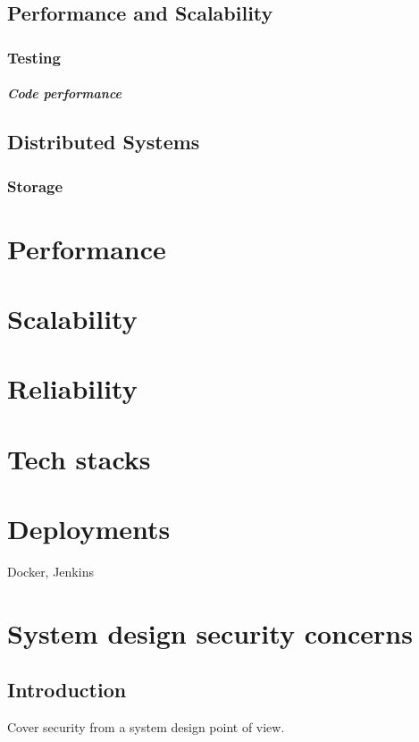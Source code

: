 \documentclass[a4paper, 11pt]{book}
\begin{document}
    \section{Performance and Scalability}

    \subsection{Testing}

    \paragraph{Code performance}

    \section{Distributed Systems}

    \subsection{Storage}

    \chapter{Performance}

    \chapter{Scalability}

    \chapter{Reliability}

    \chapter{Tech stacks}

    \chapter{Deployments}
    Docker, Jenkins

    \chapter{System design security concerns}

    \section{Introduction}
    Cover security from a system design point of view.
\end{document}
